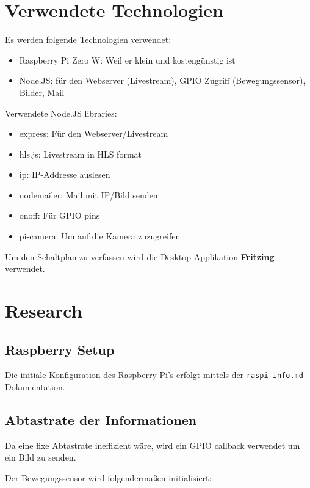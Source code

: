 \section{Verwendete Technologien}

Es werden folgende Technologien verwendet:

\begin{itemize}
    \item Raspberry Pi Zero W: Weil er klein und kostengünstig ist
    \item Node.JS: für den Webserver (Livestream), GPIO Zugriff (Bewegungssensor), Bilder, Mail
\end{itemize}

Verwendete Node.JS libraries:

\begin{itemize}
    \item express: Für den Webserver/Livestream
    \item hls.js: Livestream in HLS format
    \item ip: IP-Addresse auslesen
    \item nodemailer: Mail mit IP/Bild senden
    \item onoff: Für GPIO pins
    \item pi-camera: Um auf die Kamera zuzugreifen
\end{itemize}

Um den Schaltplan zu verfassen wird die Desktop-Applikation \textbf{Fritzing} verwendet.

\clearpage
\section{Research}

\subsection{Raspberry Setup}

Die initiale Konfiguration des Raspberry Pi's erfolgt mittels der \texttt{raspi-info.md} Dokumentation.

\subsection{Abtastrate der Informationen}

Da eine fixe Abtastrate ineffizient wäre, wird ein GPIO callback verwendet um ein Bild zu senden.

Der Bewegungssensor wird folgendermaßen initialisiert:


